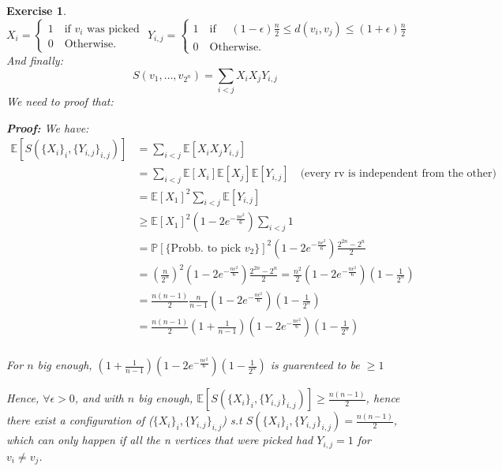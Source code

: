 \documentclass{article}
\newtheorem{exo}{Exercise}
\def\P{\mathbb{P}}
\def\E{\mathbb{E}}
\begin{document}
\begin{exo}{\ \\}
\[
X_i = 
\begin{cases}
    1 \quad \text{if $v_i$ was picked } \\
    0 \quad \text{Otherwise.}
\end{cases}
Y_{i,j} = 
\begin{cases}
    1 \quad \text{if } \quad
    (1-\epsilon)\frac{n}{2} \leq d(v_i, v_j) \leq (1+\epsilon)\frac{n}{2} \\
    0 \quad \text{Otherwise.}
\end{cases}
\]
And finally:
\[
S(v_1, \dots, v_{2^n}) = \sum_{i < j} X_i X_j Y_{i,j}
\]
We need to proof that:

\begin{tcolorbox}    
\textbf{Proof:} 
We have:
\begin{align*}
    \E[S(\{X_i\}_i, \{Y_{i,j}\}_{i,j})] 
    &= \sum_{i < j} \E[X_i X_j Y_{i,j}] \\
    &= \sum_{i < j} \E[X_i] \E[X_j] \E[Y_{i,j}] 
    \quad \text{(every rv is independent from the other)}\\
    &= \E[X_1]^2 \sum_{i < j} \E[Y_{i,j}] \\
    &\geq \E[X_1]^2 (1 - 2 e^{-\frac{n \epsilon^2 }{6}})  \sum_{i < j} 1 \\ 
    &= \P[\{\text{Probb. to pick $v_2$}\}]^2 (1 - 2 e^{-\frac{n \epsilon^2 }{6}})  
    \frac{2^{2n} - 2^n}{2} \\ 
    &= \left(\frac{n}{2^n}\right)^2 (1 - 2 e^{-\frac{n \epsilon^2 }{6}})  
    \frac{2^{2n} - 2^n}{2}
    = \frac{n^2}{2}  (1 - 2 e^{-\frac{n \epsilon^2 }{6}})(1 - \frac{1}{2^n} ) \\ 
    &= \frac{n(n-1)}{2} \frac{n}{n-1}  (1 - 2 e^{-\frac{n \epsilon^2 }{6}})(1 - \frac{1}{2^n} ) \\ 
    &= \frac{n(n-1)}{2} 
    (1 + \frac{1}{n-1})(1 - 2 e^{-\frac{n \epsilon^2 }{6}})(1 - \frac{1}{2^n} ) \\ 
\end{align*}

For $n$ big enough, 
$(1 + \frac{1}{n-1})(1 - 2 e^{-\frac{n \epsilon^2 }{6}})(1 - \frac{1}{2^n} )$ is guarenteed to be $\geq 1$

Hence, $\forall \epsilon > 0$, and  with $n$ big enough, $\E[S(\{X_i\}_i, \{Y_{i,j}\}_{i,j})] \geq \frac{n(n-1)}{2} $, hence there exist a configuration of ($\{X_i\}_i, \{Y_{i,j}\}_{i,j}$) s.t $S(\{X_i\}_i, \{Y_{i,j}\}_{i,j})  = \frac{n(n-1)}{2} $, which can only happen if all the n vertices that were picked had $Y_{i,j} =1$ for $v_i \neq v_j$.
\end{tcolorbox}
\end{exo}
\end{document}
